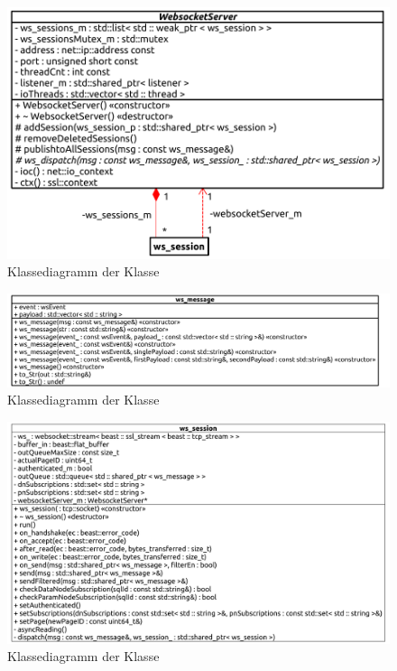 \begin{figure}[ht]
  \centering
  \includegraphics[width=\textwidth]{content/hauptteil/umsetzungPoC/backend/uml/classesOfOverview/WebsocketServer.pdf}
  \caption{Klassediagramm der Klasse }
  \label{fig:backend:classDiag:WebsocketServer}
\end{figure}
\begin{figure}[ht]
  \centering
  \includegraphics[width=\textwidth]{content/hauptteil/umsetzungPoC/backend/uml/classesOfOverview/ws_message.pdf}
  \caption{Klassediagramm der Klasse }
  \label{fig:backend:classDiag:wsMsg}
\end{figure}


\begin{figure}[ht]
  \centering
  \includegraphics[width=\textwidth]{content/hauptteil/umsetzungPoC/backend/uml/classesOfOverview/ws_session.pdf}
  \caption{Klassediagramm der Klasse }
  \label{fig:backend:classDiag:wsSession}
\end{figure}